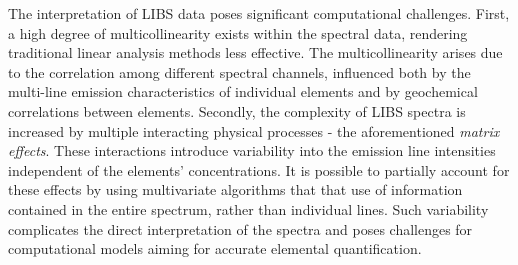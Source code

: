 %

The interpretation of LIBS data poses significant computational challenges.
First, a high degree of multicollinearity exists within the spectral data, rendering traditional linear analysis methods less effective.
The multicollinearity arises due to the correlation among different spectral channels, influenced both by the multi-line emission characteristics of individual elements and by geochemical correlations between elements\cite{andersonImprovedAccuracyQuantitative2017}.
Secondly, the complexity of LIBS spectra is increased by multiple interacting physical processes - the aforementioned \textit{matrix effects}.
These interactions introduce variability into the emission line intensities independent of the elements' concentrations.
It is possible to partially account for these effects by using multivariate algorithms that that use of information contained in the entire spectrum, rather than individual lines\cite{andersonImprovedAccuracyQuantitative2017}.
Such variability complicates the direct interpretation of the spectra and poses challenges for computational models aiming for accurate elemental quantification.
